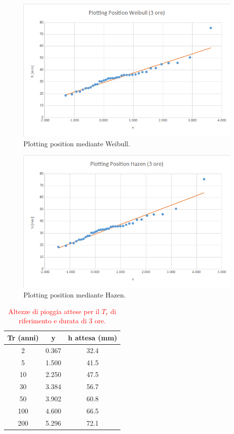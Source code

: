     \begin{figure}[H]\centering
        \includegraphics[scale=.5]{immagini/plot_pos_weib_3ore.png}
        \caption{Plotting position mediante Weibull.}
      \label{plot_pos_weib_3ore}
 \end{figure}

\begin{figure}[H]\centering
        \includegraphics[scale=.5]{immagini/plot_pos_hazen_3ore.png}
        \caption{Plotting position mediante Hazen.}
      \label{plot_pos_hazen_3ore}
\end{figure}

\begin{table}[H] \centering
    \caption{\textcolor{red}{Altezze di pioggia attese per il $T_r$ di riferimento e durata di 3 ore.}}
        \begin{tabular}{ccc}
        \toprule
        Tr (anni) & y     & h attesa (mm) \\
        \midrule
        2 & 0.367 & 32.4  \\
        5 & 1.500 & 41.5  \\
        10  & 2.250 & 47.5          \\
        30  & 3.384 & 56.7          \\
        50  & 3.902 & 60.8          \\
        100 & 4.600 & 66.5          \\
        200 & 5.296 & 72.1          \\         
        \bottomrule
        \end{tabular}
\end{table}

